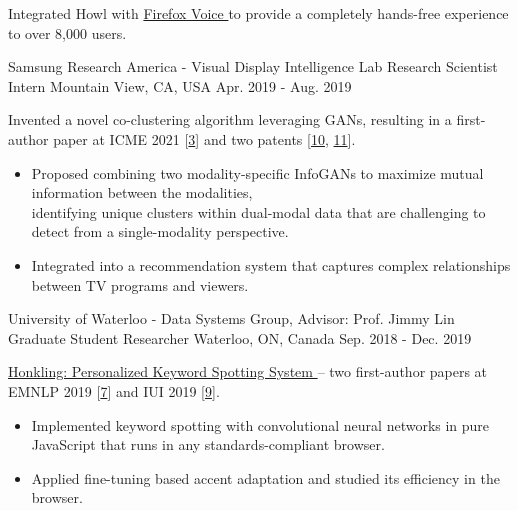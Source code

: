 \begin{cventries}
{\begin{cvitems}
\item {Integrated Howl with \href{https://github.com/mozilla-extensions/firefox-voice}{Firefox Voice {\small \faGithub}} to provide a completely hands-free experience to over 8,000 users.}
\end{cvitems}
}
\cventry
{Samsung Research America - Visual Display Intelligence Lab} %
{Research Scientist Intern} %
{Mountain View, CA, USA} %
{Apr. 2019 - Aug. 2019} %
{ %
\begin{cvitems}
\item {Invented a novel co-clustering algorithm leveraging GANs, resulting in a first-author paper at ICME 2021 [\hyperlink{CI-GAN:ICME}{3}] and two patents [\hyperlink{CI-GAN:International}{10}, \hyperlink{CI-GAN:US}{11}].}
\begin{itemize}[label=$\cdot$,leftmargin=0.7em]
\item {Proposed combining two modality-specific InfoGANs to maximize mutual information between the modalities, \\ identifying unique clusters within dual-modal data that are challenging to detect from a single-modality perspective.}
\item {Integrated into a recommendation system that captures complex relationships between TV programs and viewers.}
\end{itemize}
\end{cvitems}
}
\cventry
{University of Waterloo - Data Systems Group, Advisor: Prof. Jimmy Lin} %
{Graduate Student Researcher} %
{Waterloo, ON, Canada} %
{Sep. 2018 - Dec. 2019} %
{ %
\begin{cvitems}
\item {\href{https://github.com/castorini/honkling}{Honkling: Personalized Keyword Spotting System {\small \faGithub}} -- two first-author papers at EMNLP 2019 [\hyperlink{honkling:EMNLP}{7}] and IUI 2019 [\hyperlink{honkling:IUI}{9}].}
\begin{itemize}[label=$\cdot$,leftmargin=0.7em]
\item {Implemented keyword spotting with convolutional neural networks in pure JavaScript that runs in any standards-compliant browser.}
\item {Applied fine-tuning based accent adaptation and studied its efficiency in the browser.}
\end{itemize}

\end{cvitems}}
\end{cventries}
